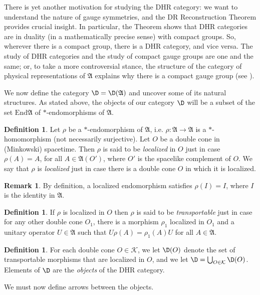 \documentclass[11pt]{article}
\newcommand{\alg}[1]{\mathfrak{#1}}
\theoremstyle{definition}
\theoremstyle{definition}
\newtheorem{defn}[thm]{Definition}
\newtheorem{note}[thm]{Remark}
\theoremstyle{remark}
\def\2#1{{\mathcal #1}}
\def\al#1{{\mathfrak #1}}
\newcommand{\End}{\mathrm{End}}
\begin{document}
There is yet another motivation for studying the DHR category: we want
to understand the nature of gauge symmetries, and the DR
Reconstruction Theorem provides crucial insight.  In particular, the
Theorem shows that DHR categories are in duality (in a mathematically
precise sense) with compact groups.  So, wherever there is a compact
group, there is a DHR category, and vice versa.  The study of DHR
categories and the study of compact gauge groups are one and the same;
or, to take a more controversial stance, the structure of the category
of physical representations of $\al A$ explains why there is a compact
gauge group (see \cite{rob7}).

We now define the category $\D = \D (\al A)$ and uncover some of its
natural structures.  As stated above, the objects of our category $\D$
will be a subset of the set $\End \al A$ of $*$-endomorphisms of $\al
A$.

\begin{defn} Let $\rho$ be a $*$-endomorphism of $\al
  A$, i.e. $\rho :\al A\to \al A$ is a $*$-homomorphism
  (not necessarily surjective).  Let $O$ be a double
  cone in (Minkowski) spacetime.  Then $\rho$ is said
  to be \emph{localized} in $O$ just in case $\rho
  (A)=A$, for all $A\in \al A(O')$, where $O'$ is the
  spacelike complement of $O$.  We say that $\rho$ is
  \emph{localized} just in case there is a double cone
  $O$ in which it is localized.
\end{defn}

\begin{note} By definition, a localized endomorphism satisfies $\rho (I)=I$, where
  $I$ is the identity in $\alg{A}$. \end{note}

\begin{defn} If $\rho$ is localized in $O$ then $\rho$ is said to be
  \emph{transportable} just in case for any other double cone $O_1$, there is a
  morphism $\rho _1$ localized in $O_1$ and a unitary operator $U\in \alg{A}$ such
  that $U\rho (A)=\rho _1(A)U$ for all $A\in \alg{A}$.
\end{defn}

\begin{defn} For each double cone $O\in \2K$, we let $\D (O)$ denote the set of
  transportable morphisms that are localized in $O$, and we let $\D = \bigcup _{O\in
    \2K}\D (O)$.  Elements of $\D$ are the \emph{objects} of the DHR category.
\end{defn}

We must now define arrows between the objects.
\end{document}
